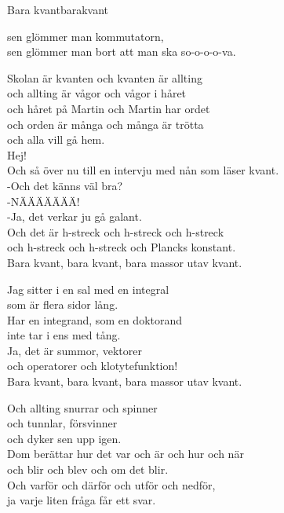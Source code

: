 \begin{song}{Bara kvant}{barakvant}
\begin{vers}
    sen glömmer man kommutatorn,\\
    sen glömmer man bort att man ska so-o-o-o-va.\\
    \end{vers}
    \begin{vers}
    Skolan är kvanten och kvanten är allting\\
    och allting är vågor och vågor i håret\\
    och håret på Martin och Martin har ordet\\
    och orden är många och många är trötta\\
    och alla vill gå hem.\\
    Hej!\\
    Och så över nu till en intervju med nån som läser kvant.\\
    -Och det känns väl bra?\\
    -NÄÄÄÄÄÄÄ!\\
    -Ja, det verkar ju gå galant.\\
    Och det är h-streck och h-streck och h-streck\\
    och h-streck och h-streck och Plancks konstant.\\
    Bara kvant, bara kvant, bara massor utav kvant.\\
    \end{vers}
    \begin{vers}
    Jag sitter i en sal med en integral\\
    som är flera sidor lång.\\
    Har en integrand, som en doktorand\\
    inte tar i ens med tång.\\
    Ja, det är summor, vektorer\\
    och operatorer och klotytefunktion!\\
    Bara kvant, bara kvant, bara massor utav kvant.\\
    \end{vers}
    \begin{vers}
    Och allting snurrar och spinner\\
    och tunnlar, försvinner\\
    och dyker sen upp igen.\\
    Dom berättar hur det var och är och hur och när\\
    och blir och blev och om det blir.\\
    Och varför och därför och utför och nedför,\\
    ja varje liten fråga får ett svar.\\

\end{vers}
\end{song}
